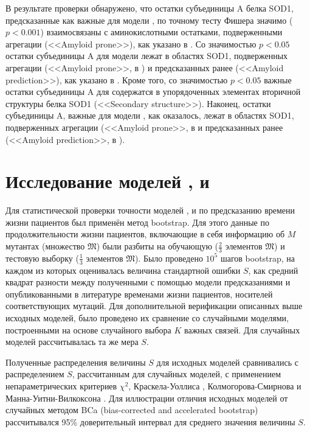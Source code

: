 В результате проверки обнаружено, что остатки субъединицы A белка SOD1, предсказанные как важные для модели \modelpphb{}, по точному тесту Фишера значимо ($p < 0.001$) взаимосвязаны с аминокислотными остатками, подверженными агрегации (<<Amyloid prone>>), как указано в \cite{Durazo2009}. Со значимостью $p < 0.05$ остатки субъединицы A для модели \modelpwhb{} лежат в областях SOD1, подверженных агрегации (<<Amyloid prone>>, в \cite{Durazo2009}) и предсказанных ранее (<<Amyloid prediction>>), как указано в \cite{Wright2013}. Кроме того, со значимостью $p < 0.05$ важные остатки субъединицы A для \modelpwhb{} содержатся в упорядоченных элементах вторичной структуры белка SOD1 (<<Secondary structure>>). Наконец, остатки субъединицы A, важные для модели \modelwbr{}, как оказалось, лежат в областях SOD1, подверженных агрегации (<<Amyloid prone>>, в \cite{Durazo2009} и предсказанных ранее (<<Amyloid prediction>>, в \cite{Wright2013}).

\section{Исследование моделей \modelpphb{}, \modelpwhb{} и \modelwbr{}} \label{sect_MD_analysis}

Для статистической проверки точности моделей \modelpphb{}, \modelpwhb{} и \modelwbr{} по предсказанию времени жизни пациентов был применён метод bootstrap. Для этого данные по продолжительности жизни пациентов, включающие в себя информацию об $M$ мутантах (множество $\mathfrak{M}$) были разбиты на обучающую ($\frac{2}{3}$ элементов $\mathfrak{M}$) и тестовую выборку ($\frac{1}{3}$ элементов $\mathfrak{M}$). Было проведено $10^5$ шагов bootstrap, на каждом из которых оценивалась величина стандартной ошибки $S$, как средний квадрат разности между полученными с помощью модели предсказаниями и опубликованными в литературе временами жизни пациентов, носителей соответствующих мутаций.
Для дополнительной верификации описанных выше исходных моделей, было проведено их сравнение со случайными моделями, построенными на основе случайного выбора $K$ важных связей. Для случайных моделей рассчитывалась та же мера $S$.

Полученные распределения величины $S$ для исходных моделей сравнивались с распределением $S$, рассчитанным для случайных моделей, с применением непараметрических критериев $\chi^2$, Краскела-Уоллиса \cite{Kruskal1952}, Колмогорова-Смирнова \cite{Kolmogorov1933,Smirnov1948} и Манна-Уитни-Вилкоксона \cite{Mann1947,Wilcoxon1945}. Для иллюстрации отличия исходных моделей от случайных методом BCa (bias-corrected and accelerated bootstrap) \cite{efron_better_1987} рассчитывался 95\% доверительный интервал для среднего значения величины $S$.

